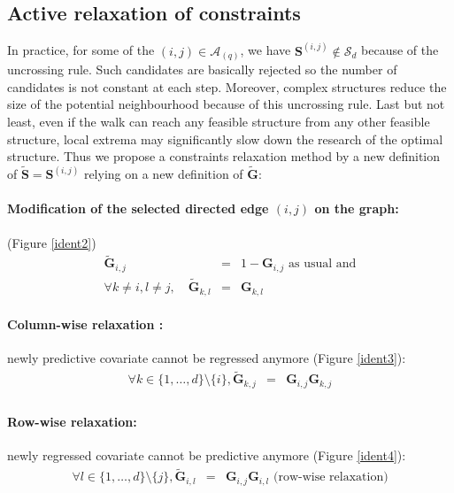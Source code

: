 \documentclass[12pt,a4paper]{report}
\begin{document}
		\subsection{Active relaxation of constraints}
		In practice, for some of the $(i,j) \in \mathcal{A}_{(q)}$, we have $\boldsymbol{S}^{(i,j)}\notin \mathcal{S}_d$ because of the uncrossing rule. Such candidates are basically rejected so the number of candidates is not constant at each step. Moreover, complex structures reduce the size of the potential neighbourhood because of this uncrossing rule. Last but not least, even if the walk can reach any feasible structure from any other feasible structure, local extrema may significantly slow down the research of the optimal structure.
		Thus we propose a constraints relaxation method by a new definition of $\tilde{\boldsymbol{S}}=\boldsymbol{S}^{(i,j)}$ relying on a new definition of $\tilde{\boldsymbol{G}}$:
		\paragraph{Modification of the selected directed edge $(i,j)$ on the graph:} (Figure \ref{ident2})
	\begin{eqnarray}
		\tilde{\boldsymbol{G}}_{i,j}&=&1-\boldsymbol{G}_{i,j} \textrm{ as usual and} \nonumber \\
		\forall k \neq i, l\neq j, \quad	\tilde{\boldsymbol{G}}_{k,l}&=&\boldsymbol{G}_{k,l} \nonumber 
\end{eqnarray}	
\paragraph{Column-wise relaxation :}		
newly predictive covariate cannot be regressed anymore (Figure \ref{ident3}):
		\begin{eqnarray}
		\forall k \in \{1,\dots,d\}\setminus \{i\}, \tilde{\boldsymbol{G}}_{k,j}&=&\boldsymbol{G}_{i,j}\boldsymbol{G}_{k,j}  \nonumber  \\
				\end{eqnarray}
\paragraph{Row-wise relaxation:} newly regressed covariate cannot be predictive anymore (Figure \ref{ident4}):
		\begin{eqnarray}
		\forall l \in \{1,\dots,d\}\setminus \{j\}, \tilde{\boldsymbol{G}}_{i,l}&=&\boldsymbol{G}_{i,j}\boldsymbol{G}_{i,l} \textrm{ (row-wise relaxation)} \nonumber 
	\end{eqnarray} \\
	
\end{document}
